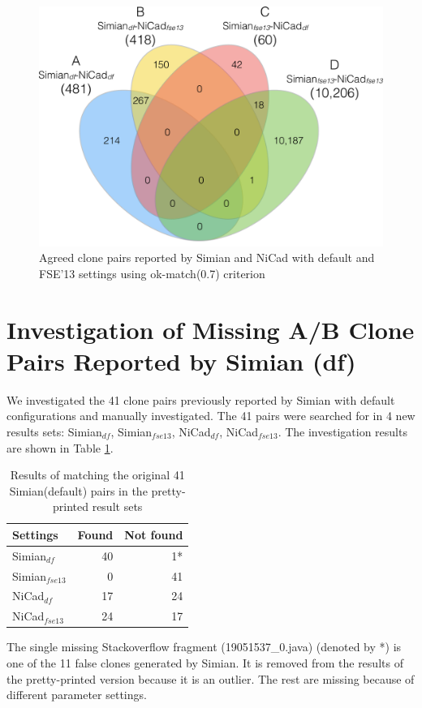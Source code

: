 \documentclass{IEEEtran}
\begin{document}
\begin{figure}[H]
	\centering
	\includegraphics[width=0.5\linewidth]{venn4_pairs_ok}
	\caption[Agreed clone pairs reported by Simian and NiCad with default and FSE'13 settings using ok-match(0.7) criterion]{Agreed clone pairs reported by Simian and NiCad with default and FSE'13 settings using ok-match(0.7) criterion}
	\label{fig:venn4_pairs}
\end{figure}

\section*{Investigation of Missing A/B Clone Pairs Reported by Simian (df)}
We investigated the 41 clone pairs previously reported by Simian with default configurations and manually investigated. The 41 pairs were searched for in 4 new results sets: Simian$_{df}$, Simian$_{fse13}$, NiCad$_{df}$, NiCad$_{fse13}$. The investigation results are shown in Table \ref{tab:search}.

\begin{table}[H]
	\centering
	\caption{Results of matching the original 41 Simian(default) pairs in the pretty-printed result sets}
	\label{tab:search}
	\begin{tabular}{l|r|r}
		\hline 
		Settings & Found & Not found \\ 
		\hline 
		Simian$_{df}$  &  40 & 1* \\ 
		\hline 
		Simian$_{fse13}$ & 0 & 41  \\ 
		\hline 
		NiCad$_{df}$  & 17 & 24 \\ 
		\hline 
		NiCad$_{fse13}$ &  24 & 17 \\ 
		\hline 
	\end{tabular} 
\end{table}

The single missing Stackoverflow fragment (19051537\_0.java) (denoted by *) is one of the 11 false clones generated by Simian. It is removed from the results of the pretty-printed version because it is an outlier. The rest are missing because of different parameter settings.
\end{document}
